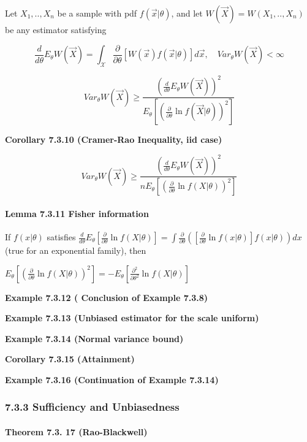 \documentclass[6pt,Portrait]{article}
\let\oldparagraph\paragraph
\renewcommand{\paragraph}[1]{\oldparagraph{#1}\mbox{}}
\begin{document}
Let \(X_1,..,X_n\) be a sample with pdf \(f(\vec x|\theta)\), and let
\(W(\vec X)=W(X_1,..,X_n)\) be any estimator satisfying

\[\frac{d}{d\theta}E_\theta W(\vec X)=\int_{\mathcal{X}}\frac{\partial}{\partial\theta}\left[W(\vec x)f(\vec x|\theta)\right]d\vec x,\quad Var_\theta W(\vec X)<\infty\]

\[Var_\theta W(\vec X)\ge\frac{(\frac{d}{d\theta}E_\theta W(\vec X))^2}{E_\theta\left[(\frac{\partial}{\partial\theta}\ln f(\vec X|\theta))^2\right]}\]

\textbf{Corollary 7.3.10 (Cramer-Rao Inequality, iid case)}

\[Var_\theta W(\vec X)\ge\frac{(\frac{d}{d\theta}E_\theta W(\vec X))^2}{nE_\theta\left[(\frac{\partial}{\partial\theta}\ln f(X|\theta))^2\right]}\]

\hypertarget{FishI}{%
\paragraph{\texorpdfstring{\textbf{Lemma 7.3.11 Fisher
information}}{Lemma 7.3.11 Fisher information}}\label{FishI}}

If \(f(x|\theta)\) satisfies
\(\frac{d}{d\theta}E_\theta\left[\frac{\partial}{\partial\theta}\ln f(X|\theta)\right]=\int\frac{\partial}{\partial\theta}\left(\left[\frac{\partial}{\partial\theta}\ln f(x|\theta)\right]f(x|\theta)\right)dx\)
(true for an exponential family), then

\(E_\theta\left[(\frac{\partial}{\partial\theta}\ln f(X|\theta))^2\right]=-E_\theta\left[\frac{\partial^2}{\partial\theta^2}\ln f(X|\theta)\right]\)

\textbf{Example 7.3.12 ( Conclusion of Example 7.3.8)}

\textbf{Example 7.3.13 (Unbiased estimator for the scale uniform)}

\textbf{Example 7.3.14 (Normal variance bound)}

\textbf{Corollary 7.3.15 (Attainment)}

\textbf{Example 7.3.16 (Continuation of Example 7.3.14)}

\hypertarget{sufficiency-and-unbiasedness}{%
\subsubsection{7.3.3 Sufficiency and
Unbiasedness}\label{sufficiency-and-unbiasedness}}

\hypertarget{Rao-Bla}{%
\paragraph{\texorpdfstring{\textbf{Theorem 7.3. 17
(Rao-Blackwell)}}{Theorem 7.3. 17 (Rao-Blackwell)}}\label{Rao-Bla}}
\end{document}

